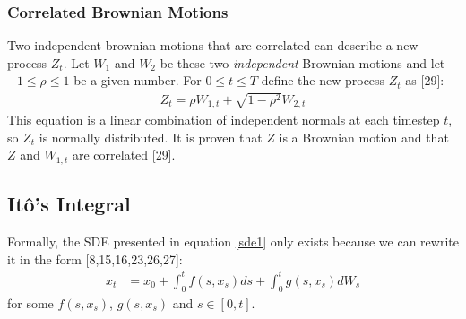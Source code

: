 \documentclass[12pt,twoside]{reedthesis}
\theoremstyle{definition}
\theoremstyle{definition}
\theoremstyle{remark}
\begin{document}
  \subsubsection{Correlated Brownian Motions}\label{corr}
  
  Two independent brownian motions that are correlated can describe a new
  process \(Z_t\). Let \(W_1\) and \(W_2\) be these two \emph{independent}
  Brownian motions and let \(-1 \leq \rho \leq 1\) be a given number. For
  \(0 \leq t \leq T\) define the new process \(Z_t\) as {[}29{]}:
  \begin{align}
  \label{eq:corr_brow}
  Z_t = \rho W_{1,t} + \sqrt{1-\rho^2}W_{2,t}
  \end{align}
  \noindent
  This equation is a linear combination of independent normals at each
  timestep \(t\), so \(Z_t\) is normally distributed. It is proven that
  \(Z\) is a Brownian motion and that \(Z\) and \(W_{1,t}\) are correlated
  {[}29{]}.
  
  \subsection{Itô's Integral}\label{itos-integral}
  
  Formally, the SDE presented in equation \ref{sde1} only exists because
  we can rewrite it in the form {[}8,15,16,23,26,27{]}:
  \begin{align} \label{sde1}
  x_t &= x_0 + \int_{0}^{t}{f(s, x_s)ds} + \int_{0}^{t}{g(s, x_s)dW_s}
  \end{align}
  \noindent
  for some \(f(s, x_s)\), \(g(s, x_s)\) and \(s \in [0,t]\).
  
\end{document}
